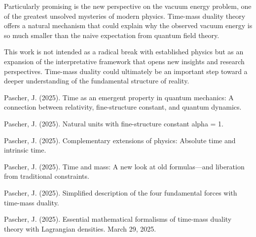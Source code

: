 \documentclass[a4paper,12pt]{article}
\begin{document}
	Particularly promising is the new perspective on the vacuum energy problem, one of the greatest unsolved mysteries of modern physics. Time-mass duality theory offers a natural mechanism that could explain why the observed vacuum energy is so much smaller than the naive expectation from quantum field theory.
	
	This work is not intended as a radical break with established physics but as an expansion of the interpretative framework that opens new insights and research perspectives. Time-mass duality could ultimately be an important step toward a deeper understanding of the fundamental structure of reality.
	
	\begin{thebibliography}{9}
		
		 Pascher, J. (2025). Time as an emergent property in quantum mechanics: A connection between relativity, fine-structure constant, and quantum dynamics.
		
		 Pascher, J. (2025). Natural units with fine-structure constant alpha = 1.
		
		 Pascher, J. (2025). Complementary extensions of physics: Absolute time and intrinsic time.
		
		 Pascher, J. (2025). Time and mass: A new look at old formulas—and liberation from traditional constraints.
		
		 Pascher, J. (2025). Simplified description of the four fundamental forces with time-mass duality.
		
		 Pascher, J. (2025). Essential mathematical formalisms of time-mass duality theory with Lagrangian densities. March 29, 2025.
		
	\end{thebibliography}
	
\end{document}
